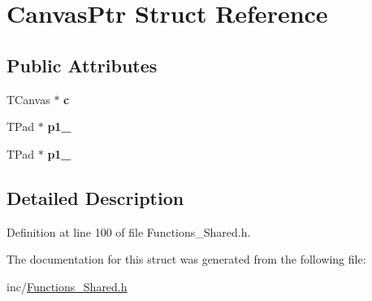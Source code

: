 \hypertarget{structCanvasPtr}{}\section{Canvas\+Ptr Struct Reference}
\label{structCanvasPtr}
\subsection*{Public Attributes}
\begin{DoxyCompactItemize}
\item 
\hypertarget{structCanvasPtr_a43aa501c472e73caeb5c1c44d141c43a}{}T\+Canvas $\ast$ {\bfseries c}\label{structCanvasPtr_a43aa501c472e73caeb5c1c44d141c43a}

\item 
\hypertarget{structCanvasPtr_a6f9aae5eca044d2c731db354cb38c9c6}{}T\+Pad $\ast$ {\bfseries p1\+\_}\label{structCanvasPtr_a6f9aae5eca044d2c731db354cb38c9c6}

\item 
\hypertarget{structCanvasPtr_a49f2e1a75298107884977f77641e45f8}{}T\+Pad $\ast$ {\bfseries p1\+\_}\label{structCanvasPtr_a49f2e1a75298107884977f77641e45f8}

\end{DoxyCompactItemize}


\subsection{Detailed Description}


Definition at line 100 of file Functions\+\_\+\+Shared.\+h.



The documentation for this struct was generated from the following file\+:\begin{DoxyCompactItemize}
\item 
inc/\hyperlink{Functions__Shared_8h}{Functions\+\_\+\+Shared.\+h}\end{DoxyCompactItemize}
